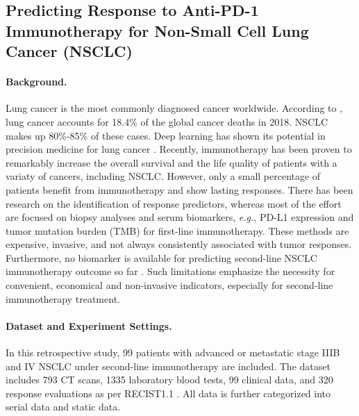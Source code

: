 \documentclass[runningheads]{llncs}
\newcommand{\eg}{\textit{e.g.}}
\begin{document}
\subsection{Predicting Response to Anti-PD-1 Immunotherapy for Non-Small Cell Lung Cancer (NSCLC)}

	\paragraph{\textbf{Background.}}

	Lung cancer is the most commonly diagnosed cancer worldwide. According to \cite{Bray2018GlobalCS}, lung cancer accounts for 18.4\% of the global cancer deaths in 2018. NSCLC makes up 80\%-85\% of these cases. Deep learning has shown its potential in precision medicine for lung cancer \cite{zhao20183d,zhao2019toward,yang2019development,yang2020relational}. Recently, immunotherapy has been proven to remarkably increase the overall survival and the life quality of patients with a variaty of cancers, including NSCLC. However, only a small percentage of patients benefit from immunotherapy and show lasting responses. There has been research on the identification of response predictors, whereas most of the effort are focused on biopsy analyses and serum biomarkers, \eg, PD-L1 expression and tumor mutation burden (TMB) for first-line immunotherapy. These methods are expensive, invasive, and not always consistently associated with tumor responses. Furthermore, no biomarker is available for predicting second-line NSCLC immunotherapy outcome so far . Such limitations emphasize the necessity for convenient, economical and non-invasive indicators, especially for second-line immunotherapy treatment.

\paragraph{\textbf{Dataset and Experiment Settings.}}

In this retrospective study, 99 patients with advanced or metastatic stage IIIB and IV NSCLC under second-line immunotherapy are included. The dataset includes 793 CT scans, 1335 laboratory blood tests, 99 clinical data, and 320 response evaluations as per RECIST1.1 \cite{Eisenhauer2009NewRE}. All data is further categorized into serial data and static data.
\end{document}
